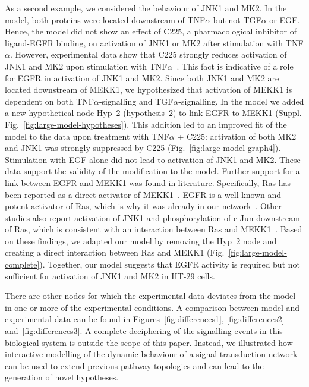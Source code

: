 As a second example, we considered the behaviour of JNK1 and MK2. In the model, both
proteins were located downstream of TNF$\alpha$ but not TGF$\alpha$ or EGF. Hence, the
model did not show an effect of C225, a pharmacological inhibitor of ligand-EGFR
binding, on activation of JNK1 or MK2 after stimulation with TNF$\alpha$. However, experimental
data show that C225 strongly reduces activation of JNK1 and MK2 upon stimulation with 
TNF$\alpha$~\citep{pathway-autocrine}.
This fact is indicative of a role for EGFR in activation of JNK1 and MK2. Since both JNK1 and MK2
are located downstream of MEKK1, we hypothesized that activation
of MEKK1 is dependent on
both TNF$\alpha$-signalling and TGF$\alpha$-signalling. In the model we added a new
hypothetical node {\sf Hyp~2} (hypothesis~2) to link EGFR to MEKK1 (Suppl. Fig.~\ref{fig:large-model-hypotheses}).
This addition led to an improved fit of the model to the data upon treatment with TNF$\alpha$ + C225:
activation of both MK2 and JNK1 was strongly suppressed by C225 (Fig.~\ref{fig:large-model-graph4}).
Stimulation with EGF alone did not lead to activation of JNK1 and MK2.
These data support the validity of the modification to the model.
Further support for a link between EGFR and MEKK1 was found in literature. Specifically,
Ras has been reported as a direct activator of
MEKK1~\citep{ras-mekk1}. EGFR is a well-known and potent activator of Ras,
which is why it was already in our network~\citep{kegg}.
Other studies also report activation of JNK1 and phosphorylation of c-Jun downstream of Ras, which is consistent with
an interaction between Ras and MEKK1~\citep{cfos-cjun,ras-jnk1}.
Based on these findings, we adapted
our model by removing the {\sf Hyp~2} node and creating a direct interaction between Ras
and MEKK1 (Fig.~\ref{fig:large-model-complete}). Together, our model suggests that EGFR activity is required 
but not sufficient for activation of JNK1 and MK2 in HT-29 cells.


There are other nodes for which the experimental data deviates from the model in one or more of the experimental conditions.
A comparison between model and experimental data can be found in Figures~\ref{fig:differences1}, \ref{fig:differences2} and~\ref{fig:differences3}.
A complete deciphering of the signalling events
in this biological system is outside the scope of this paper. Instead, we illustrated how interactive modelling of the dynamic behaviour
of a signal transduction network can be used to extend previous pathway topologies and can lead to the generation of novel hypotheses.
